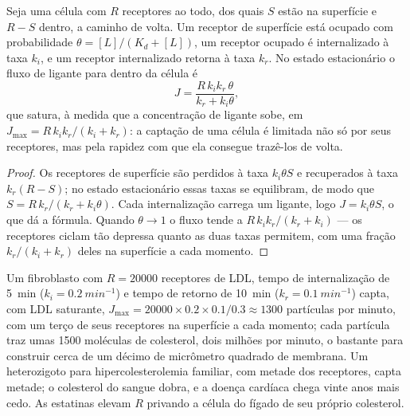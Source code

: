 \begin{proposition}\label{prop:b3:membrane-traffic:uptake}
Seja uma célula com $R$ receptores ao todo, dos quais $S$ estão na
superfície e $R - S$ dentro, a caminho de volta. Um receptor de
superfície está ocupado com probabilidade $\theta = [L]/(K_{d} + [L])$,
um receptor ocupado é internalizado à taxa $k_{i}$, e um receptor
internalizado retorna à taxa $k_{r}$. No estado estacionário o fluxo de
ligante para dentro da célula é
\[
J = \frac{R\,k_{i}k_{r}\,\theta}{k_{r} + k_{i}\theta},
\]
que satura, à medida que a concentração de ligante sobe, em
$J_{\max} =
R\,k_{i}k_{r}/(k_{i} + k_{r})$: a captação de uma célula é
limitada não só por seus receptores, mas pela rapidez com que ela
consegue trazê-los de volta.
\end{proposition}
\begin{proof}
Os receptores de superfície são perdidos à taxa $k_{i}\theta S$ e
recuperados à taxa $k_{r}(R - S)$; no estado estacionário essas taxas
se equilibram, de modo que $S = R\,k_{r}/(k_{r}
+ k_{i}\theta)$. Cada
internalização carrega um ligante, logo $J =
k_{i}\theta S$, o que dá a
fórmula. Quando $\theta \to 1$ o fluxo tende a
$R\,k_{i}k_{r}/(k_{r} + k_{i})$ --- os receptores ciclam tão depressa
quanto as duas taxas permitem, com uma fração
$k_{r}/(k_{i} + k_{r})$ deles na superfície a cada momento.
\end{proof}

\begin{example}\label{ex:b3:membrane-traffic:ldl}
Um fibroblasto com $R = \num{20000}$ receptores de LDL, tempo de
internalização de \qty{5}{min} ($k_{i} = \qty{0.2}{min^{-1}}$) e tempo
de retorno de \qty{10}{min} ($k_{r} = \qty{0.1}{min^{-1}}$) capta, com
LDL saturante, $J_{\max} = \num{20000}\times 0.2\times 0.1/0.3 \approx 1300$ partículas por minuto, com um terço de seus receptores na
superfície a cada momento; cada partícula traz umas \num{1500}
moléculas de colesterol, dois milhões por minuto, o bastante para
construir cerca de um décimo de micrômetro quadrado de membrana. Um
heterozigoto para hipercolesterolemia familiar, com metade dos
receptores, capta metade; o colesterol do sangue dobra, e a doença
cardíaca chega vinte anos mais cedo. As estatinas elevam $R$ privando a
célula do fígado de seu próprio colesterol.
\end{example}

